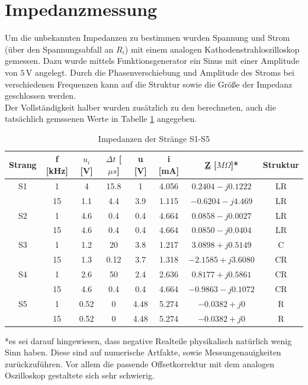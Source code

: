 \section{Impedanzmessung}
\label{sc:impedanzmessung}
Um die unbekannten Impedanzen zu bestimmen wurden Spannung und Strom (über den Spannungsabfall an $R_i$) mit einem analogen Kathodenstrahloszilloskop gemessen. Dazu wurde mittels Funktionsgenerator ein Sinus mit einer Amplitude von  $5\,$V angelegt. Durch die Phasenverschiebung und Amplitude des Stroms bei verschiedenen Frequenzen kann auf die Struktur sowie die Größe der Impedanz geschlossen werden. \\
Der Vollständigkeit halber wurden zusätzlich zu den berechneten, auch die tatsächlich gemssenen Werte in Tabelle \ref{tb:imp} angegeben. 
\begin{table}[h]
	\centering
	\begin{tabular}{|c|c||c|c||c|c|c|c|}
	\hline 
	Strang & f [kHz] & $u_i$ [V] & $\Delta t$ [$\mu s$] & u [V] & i [mA] & \underline{Z} [$M\Omega$]* & Struktur \\ 
	\hline 
	S1 & 1 & 4 & 15.8 & 1 & 4.056 & $0.2404 - j0.1222$ & LR \\ 
	\hline 
	 & 15 & 1.1 & 4.4 & 3.9 & 1.115 & $-0.6204 - j4.469$ & LR \\ 
	\hline 
	S2 & 1 & 4.6 & 0.4 & 0.4 & 4.664 & $0.0858 - j0.0027 $ & LR \\ 
	\hline 
	 & 15 & 4.6 & 0.4 & 0.4 & 4.664 & $0.0850 - j0.0404 $ & LR \\ 
	\hline 
	S3 & 1 & 1.2 & 20 & 3.8 & 1.217 & $3.0898 + j0.5149 $& C \\ 
	\hline 
	 & 15 & 1.3 & 0.12 & 3.7 & 1.318 & $-2.1585 + j3.6080 $ & CR \\ 
	\hline 
	S4 & 1 & 2.6 & 50 & 2.4 & 2.636 & $0.8177 + j0.5861 $ & CR \\ 
	\hline 
	 & 15 & 4.6 & 0.4 & 0.4 & 4.664 & $-0.9863 - j0.1072$ & CR \\ 
	\hline 
	S5 & 1 & 0.52 & 0 & 4.48 & 5.274 & $-0.0382 + j0$ & R \\ 
	\hline 
	 & 15 & 0.52 & 0 & 4.48 & 5.274  & $-0.0382 + j0$ & R \\ 
	\hline 
	\end{tabular} 
	\caption{Impedanzen der Stränge S1-S5}
	\label{tb:imp}
\end{table} *es sei darauf hingewiesen, dass negative Realteile physikalisch natürlich wenig Sinn haben. Diese sind auf numerische Artfakte, sowie Messungenauigkeiten zurückzuführen. Vor allem die passende Offsetkorrektur mit dem analogen Oszilloskop gestaltete sich sehr schwierig. \\ \\
